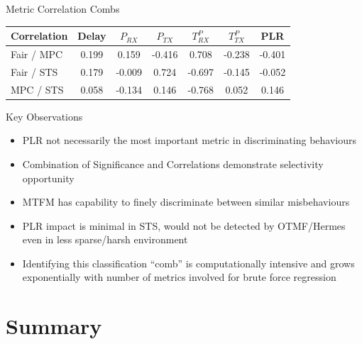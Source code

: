 \documentclass{beamer}
\begin{document}
\begin{frame}{Metric Correlation Combs}
  \begin{table}[h]
    \begin{center}
      \small
      \bgroup
      \def\arraystretch{1.2}%
      \setlength\tabcolsep{4pt}%
      \begin{tabular}{l|CCCCCC}
        \toprule
        Correlation      & Delay & $P_{RX}$ & $P_{TX}$ & $T^P_{RX}$ & $T^P_{TX}$ & PLR \\
        \midrule
        Fair / MPC       & 0.199 &  0.159   & -0.416  &  0.708   & -0.238   & -0.401\\
        Fair / STS       & 0.179 &  -0.009  &  0.724  & -0.697   & -0.145   & -0.052\\
        MPC / STS        & 0.058 &  -0.134  &  0.146  & -0.768   &  0.052   &  0.146\\
        \bottomrule
      \end{tabular}
      \egroup
    \end{center}
  \end{table}

\end{frame}
\begin{frame}{Key Observations}
  \begin{itemize}
    \item PLR not necessarily the most important metric in \alert{discriminating} behaviours
    \pause\item Combination of Significance and Correlations demonstrate selectivity opportunity
    \pause\item MTFM has capability to finely discriminate between similar misbehaviours
    \pause\item PLR impact is minimal in STS, would not be detected by OTMF/Hermes even in less sparse/harsh environment
    \pause\item Identifying this classification ``comb'' is computationally intensive and grows exponentially with number of metrics involved for brute force regression
  \end{itemize}
\end{frame}


\section*{Summary}
\end{document}
